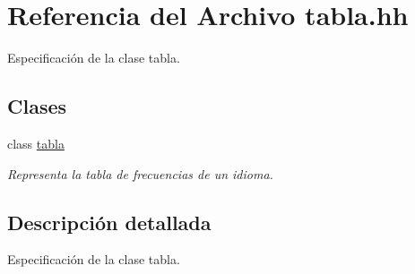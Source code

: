 \hypertarget{tabla_8hh}{}\section{Referencia del Archivo tabla.\+hh}
\label{tabla_8hh}


Especificación de la clase tabla.  


\subsection*{Clases}
\begin{DoxyCompactItemize}
\item 
class \hyperlink{classtabla}{tabla}
\begin{DoxyCompactList}\small\item\em Representa la tabla de frecuencias de un idioma. \end{DoxyCompactList}\end{DoxyCompactItemize}


\subsection{Descripción detallada}
Especificación de la clase tabla. 

